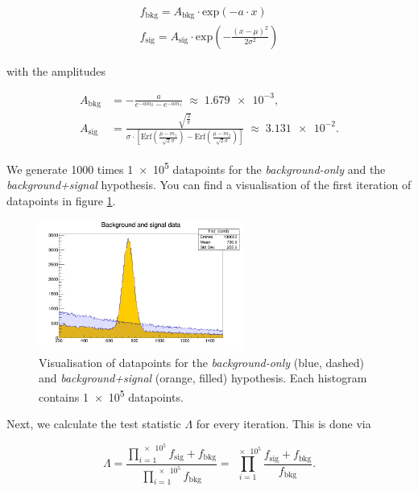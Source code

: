 \documentclass[10pt]{article}
\newenvironment{myfont}{\fontfamily{put}\selectfont}{\par}
\begin{document}
\begin{myfont}
\begin{align}
f_{\textrm{bkg}} = A_{\textrm{bkg}} \cdot \textrm{exp}(- a \cdot x) \\
f_{\textrm{sig}} = A_{\textrm{sig}} \cdot \textrm{exp}\left(-\frac{(x - \mu)^{2}}{2\sigma^{2}}\right)
\end{align}

\noindent with the amplitudes

\begin{align*}
A_{\textrm{bkg}} & = -\frac{a}{e^{-am_{2}} - e^{-am_{1}}} \;\approx\; \num{1.679e-3}, \\
A_{\textrm{sig}} & = \frac{\sqrt{\frac{2}{\pi}}}{\sigma \cdot \left[\textrm{Erf}\left(\frac{\mu - m_{1}}{\sqrt{2}\sigma}\right) - \textrm{Erf}\left(\frac{\mu - m_{2}}{\sqrt{2}\sigma}\right)\right]} \;\approx\; \num{3.131e-2}.
\end{align*}

\noindent We generate \num{1000} times \num{1e5} datapoints for the \textit{background-only} and the \textit{background+signal} hypothesis.
You can find a visualisation of the first iteration of datapoints in figure \ref{fig:ex9_iter}.

\begin{figure}[H]
  \centering
  \includegraphics[width = 0.6\textwidth]{./exercise09_MCdata.png}
  \caption{Visualisation of datapoints for the \textit{background-only} (blue, dashed) and \textit{background+signal} (orange, filled) hypothesis.
  Each histogram contains \num{1e5} datapoints.}
  \label{fig:ex9_iter}
\end{figure}

\noindent Next, we calculate the test statistic $\Lambda$ for every iteration.
This is done via

\begin{equation}
\Lambda = \frac{\prod_{i=1}^{\num{e5}}f_{\textrm{sig}} + f_{\textrm{bkg}}}{\prod_{i=1}^{\num{e5}}f_{\textrm{bkg}}} = \prod_{i=1}^{\num{e5}}\frac{f_{\textrm{sig}} + f_{\textrm{bkg}}}{f_{\textrm{bkg}}}.
\label{eq:Lambda}
\end{equation}


\end{myfont}
\end{document}
